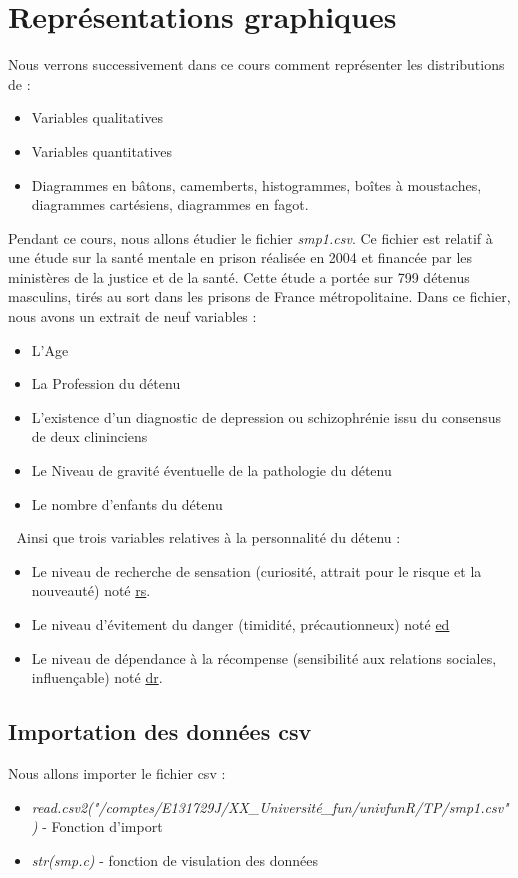\section{Représentations graphiques}
Nous verrons successivement dans ce cours comment représenter les distributions de : 
\begin{itemize}
\item Variables qualitatives
\item Variables quantitatives
\item Diagrammes en bâtons, camemberts, histogrammes, boîtes à moustaches, diagrammes cartésiens, diagrammes en fagot.
\end{itemize}
Pendant ce cours, nous allons étudier le fichier \textit{smp1.csv}. Ce fichier est relatif à une étude sur la santé mentale en prison réalisée en 2004 et financée par les ministères de la justice et de la santé.\newline
Cette étude a portée sur 799 détenus masculins, tirés au sort dans les prisons de France métropolitaine.\newline
Dans ce fichier, nous avons un extrait de neuf variables : 
\begin{itemize}	
\item L'Age
\item La Profession du détenu 
\item L'existence d'un diagnostic de depression ou schizophrénie issu du consensus de deux clininciens 
\item Le Niveau de gravité éventuelle de la pathologie du détenu
\item Le nombre d'enfants du détenu 
\end{itemize} 
\textcolor{white}{.}\newline
Ainsi que trois variables relatives à la personnalité du détenu : 
\begin{itemize}
\item Le niveau de recherche de sensation (curiosité, attrait pour le risque et la nouveauté) noté \underline{rs}.
\item Le niveau d'évitement du danger (timidité, précautionneux) noté \underline{ed}
\item Le niveau de dépendance à la récompense (sensibilité aux relations sociales, influençable) noté \underline{dr}.
\end{itemize}
\subsection{Importation des données csv}
Nous allons importer le fichier csv : 
\begin{itemize}
\item \textit{read.csv2("/comptes/E131729J/XX\_Université\_fun/univfunR/TP/smp1.csv")} - Fonction d'import
\item \textit{str(smp.c)} - fonction de visulation des données
\end{itemize}

